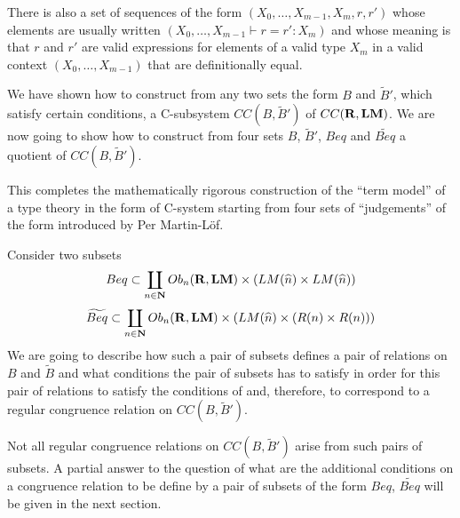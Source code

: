 \documentclass[11pt]{article}
\newcommand{\nn}{{\bf N\rm}}
\newcommand{\nat}{\nn}
\newcommand{\rr}{{\bf R}}
\newcommand{\lm}{{\bf LM}}
\newcommand{\wt}{\widetilde}
\newcommand{\wh}{\widehat}
\begin{document}
There is also a set of sequences of the form $(X_0,\dots,X_{m-1},X_m,r,r')$ whose elements are usually written $(X_0,\dots,X_{m-1}\vdash r=r':X_m)$ and whose meaning is that $r$ and $r'$ are valid expressions for elements of a valid type $X_m$ in a valid context $(X_0,\dots,X_{m-1})$ that are definitionally equal.  

We have shown how to construct  from any two sets the form $B$ and $\wt{B}'$, which satisfy certain conditions, a C-subsystem $CC(B,\wt{B}')$ of $CC(\rr,\lm)$. We are now going to show how to construct from four sets $B$, $\wt{B}'$, $Beq$ and $\wt{Beq}$ a  quotient of $CC(B,\wt{B}')$.

This completes the mathematically rigorous construction of the ``term model'' of a type theory in the form of  C-system starting from four sets of ``judgements'' of the form introduced by Per Martin-L\"of. 

Consider two subsets
%
$$Beq\subset \coprod_{n\in\nat}  Ob_n(\rr,\lm)\times (LM(\wh{n})\times LM(\wh{n}))$$
$$\wt{Beq}\subset \coprod_{n\in\nat}  Ob_n(\rr,\lm)\times (LM(\wh{n})\times (R(n)\times R(n)))$$
%
We are going to describe how such a pair of subsets defines a pair of relations on $B$ and $\wt{B}$ and what conditions the pair of subsets has to satisfy in order for this pair of relations to satisfy the conditions of \cite[Propositions 5.4]{Csubsystems} and, therefore, to correspond to a regular congruence relation on $CC(B,\wt{B}')$. 

Not all regular congruence relations on $CC(B,\wt{B}')$ arise from such pairs of subsets. A partial answer to the question of what are the additional conditions on a congruence relation to be define by a pair of subsets of the form $Beq$, $\wt{Beq}$ will be given in the next section. 
\end{document}

